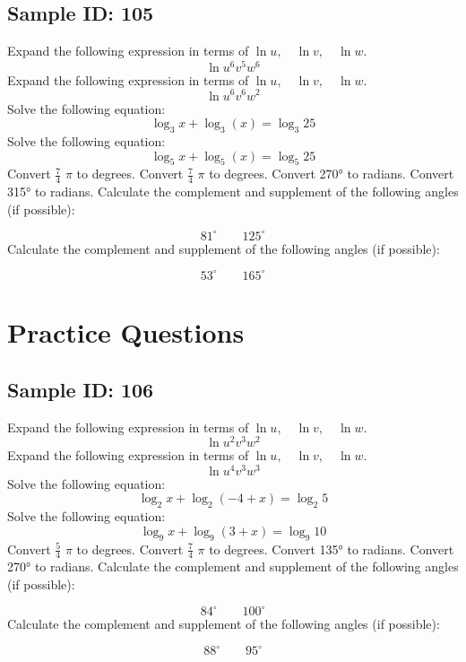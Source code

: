 \documentclass{exam}
\begin{document}
\subsection*{Sample ID: 105}
\begin{questions}
\question Expand the following expression in terms of $\ln u,\quad \ln v,\quad  \ln w$. \[\ln u^{6}v^{5}w^{6}\] 
\question Expand the following expression in terms of $\ln u,\quad \ln v,\quad  \ln w$. \[\ln u^{6}v^{6}w^{2}\] 
\question Solve the following equation: 
 \[\log_{3}{x}+\log_{3}{\left(x\right)}=\log_{3}{25}\]
\question Solve the following equation: 
 \[\log_{5}{x}+\log_{5}{\left(x\right)}=\log_{5}{25}\]
\newpage
\question Convert $\frac{7}{4}$ $\pi$   to degrees.
\question Convert $\frac{7}{4}$ $\pi$   to degrees.
\question Convert 270° to radians.
\question Convert 315° to radians.
\question Calculate the complement and supplement of the following angles (if possible):
 
                  \[81^{\circ}\quad\quad 125^{\circ}\]\question Calculate the complement and supplement of the following angles (if possible):
 
                  \[53^{\circ}\quad\quad 165^{\circ}\]\end{questions}\newpage
\section*{Practice Questions}
\subsection*{Sample ID: 106}
\begin{questions}
\question Expand the following expression in terms of $\ln u,\quad \ln v,\quad  \ln w$. \[\ln u^{2}v^{3}w^{2}\] 
\question Expand the following expression in terms of $\ln u,\quad \ln v,\quad  \ln w$. \[\ln u^{4}v^{3}w^{3}\] 
\question Solve the following equation: 
 \[\log_{2}{x}+\log_{2}{\left(-4 + x\right)}=\log_{2}{5}\]
\question Solve the following equation: 
 \[\log_{9}{x}+\log_{9}{\left(3 + x\right)}=\log_{9}{10}\]
\newpage
\question Convert $\frac{5}{4}$ $\pi$   to degrees.
\question Convert $\frac{7}{4}$ $\pi$   to degrees.
\question Convert 135° to radians.
\question Convert 270° to radians.
\question Calculate the complement and supplement of the following angles (if possible):
 
                  \[84^{\circ}\quad\quad 100^{\circ}\]\question Calculate the complement and supplement of the following angles (if possible):
 
                  \[88^{\circ}\quad\quad 95^{\circ}\]\end{questions}\newpage
\end{document}
